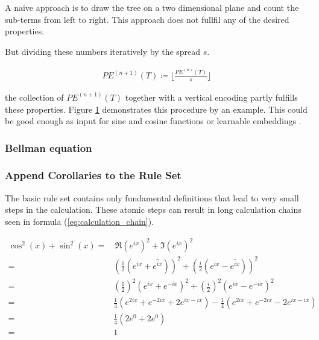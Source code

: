 \documentclass{scrartcl}
\theoremstyle{definition}
\begin{document}
A naive approach is to draw the tree on a two dimensional plane and count the sub-terms from left to right.
This approach does not fullfil any of the desired properties.

But dividing these numbers iteratively by the spread $s$.

\begin{align}
	PE^{(n+1)}\left( T \right) \coloneqq \lfloor \frac{PE^{(n)} \left( T \right)}{s} \rfloor
\end{align}

the collection of $PE^{(n+1)}\left( T \right)$ together with a vertical encoding partly fulfills these properties.
Figure \ref{fig:positional_encoding} demonstrates this procedure by an example.
This could be good enough as input for sine and cosine functions or learnable embeddings \cite{gehring2017convolutional}.

\begin{figure}[!htbp]
	\centering
	
	\label{fig:positional_encoding}
\end{figure}


\subsubsection{Bellman equation}


\subsubsection{Append Corollaries to the Rule Set}

The basic rule set contains only fundamental definitions that lead to very small steps in the calculation.
These atomic steps can result in long calculation chains seen in formula (\ref{eq:calculation_chain}).

\begin{equation}
	\label{eq:tedios_calculation}
	\begin{aligned}
		\cos^2(x)+\sin^2(x) = &\, \Re\left(e^{ix}\right)^2+\Im\left(e^{ix}\right)^2 \\
		= & \left(\frac{1}{2} \left(e^{ix}+\overline{e^{ix}}\right)\right)^2 + \left(\frac{i}{2} \left(e^{ix}-\overline{e^{ix}}\right)\right)^2 \\
		= & \left(\frac{1}{2}\right)^2 \left(e^{ix}+e^{-ix}\right)^2 + \left(\frac{i}{2}\right)^2 \left(e^{ix}-e^{-ix}\right)^2 \\
		= & \frac{1}{4} \left(e^{2ix}+e^{-2ix}+2e^{ix-ix}\right) - \frac{1}{4} \left(e^{2ix}+e^{-2ix}-2e^{ix-ix}\right) \\
		= & \frac{1}{4} \left( 2e^0+2e^0 \right) \\
		= & 1
	\end{aligned}
\end{equation}
\end{document}
